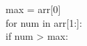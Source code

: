 \documentclass[preview]{standalone}
\begin{document}
max = arr[0]\\for num in arr[1:]:\\if num > max:\\
\end{document}
